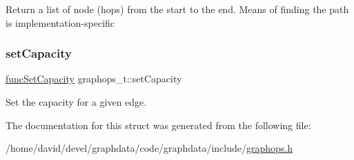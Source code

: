 Return a list of node (hops) from the start to the end. Means of finding the path is implementation-\/specific \mbox{\label{structgraphops__t_a6f05f8daf75bc380988e20e019681c0a}} 
\subsubsection{\texorpdfstring{set\+Capacity}{setCapacity}}
{\footnotesize\ttfamily \hyperlink{graphops_8h_a7f161b975929757de2684535b39d60bb}{func\+Set\+Capacity} graphops\+\_\+t\+::set\+Capacity}

Set the capacity for a given edge. 

The documentation for this struct was generated from the following file\+:\begin{DoxyCompactItemize}
\item 
/home/david/devel/graphdata/code/graphdata/include/\hyperlink{graphops_8h}{graphops.\+h}\end{DoxyCompactItemize}
